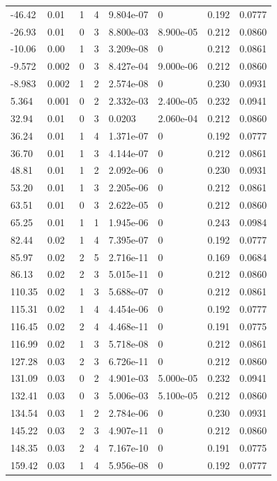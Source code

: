 \documentclass[preview]{standalone}
\begin{document}
{{\begin{tabular}{L{1.2cm}C{1.2cm} C{0.3cm}C{0.5cm} C{1.4cm}C{1.4cm} C{1.4cm}C{1.4cm}}
  -46.42  &  0.01  & 1     &  4 &  9.804e-07  & 0  & 0.192 &  0.0777   \\ 
  -26.93  &  0.01  & 0     &  3 &  8.800e-03  & 8.900e-05  & 0.212 &  0.0860   \\ 
  -10.06  &  0.00  & 1     &  3 &  3.209e-08  & 0  & 0.212 &  0.0861   \\ 
  -9.572  &  0.002  & 0     &  3 &  8.427e-04  & 9.000e-06  & 0.212 &  0.0860   \\ 
  -8.983  &  0.002  & 1     &  2 &  2.574e-08  & 0  & 0.230 &  0.0931   \\ 
  5.364  &  0.001  & 0     &  2 &  2.332e-03  & 2.400e-05  & 0.232 &  0.0941   \\ 
  32.94  &  0.01  & 0     &  3 &  0.0203  & 2.060e-04  & 0.212 &  0.0860   \\ 
  36.24  &  0.01  & 1     &  4 &  1.371e-07  & 0  & 0.192 &  0.0777   \\ 
  36.70  &  0.01  & 1     &  3 &  4.144e-07  & 0  & 0.212 &  0.0861   \\ 
  48.81  &  0.01  & 1     &  2 &  2.092e-06  & 0  & 0.230 &  0.0931   \\ 
  53.20  &  0.01  & 1     &  3 &  2.205e-06  & 0  & 0.212 &  0.0861   \\ 
  63.51  &  0.01  & 0     &  3 &  2.622e-05  & 0  & 0.212 &  0.0860   \\ 
  65.25  &  0.01  & 1     &  1 &  1.945e-06  & 0  & 0.243 &  0.0984   \\ 
  82.44  &  0.02  & 1     &  4 &  7.395e-07  & 0  & 0.192 &  0.0777   \\ 
  85.97  &  0.02  & 2     &  5 &  2.716e-11  & 0  & 0.169 &  0.0684   \\ 
  86.13  &  0.02  & 2     &  3 &  5.015e-11  & 0  & 0.212 &  0.0860   \\ 
  110.35  &  0.02  & 1     &  3 &  5.688e-07  & 0  & 0.212 &  0.0861   \\ 
  115.31  &  0.02  & 1     &  4 &  4.454e-06  & 0  & 0.192 &  0.0777   \\ 
  116.45  &  0.02  & 2     &  4 &  4.468e-11  & 0  & 0.191 &  0.0775   \\ 
  116.99  &  0.02  & 1     &  3 &  5.718e-08  & 0  & 0.212 &  0.0861   \\ 
  127.28  &  0.03  & 2     &  3 &  6.726e-11  & 0  & 0.212 &  0.0860   \\ 
  131.09  &  0.03  & 0     &  2 &  4.901e-03  & 5.000e-05  & 0.232 &  0.0941   \\ 
  132.41  &  0.03  & 0     &  3 &  5.006e-03  & 5.100e-05  & 0.212 &  0.0860   \\ 
  134.54  &  0.03  & 1     &  2 &  2.784e-06  & 0  & 0.230 &  0.0931   \\ 
  145.22  &  0.03  & 2     &  3 &  4.907e-11  & 0  & 0.212 &  0.0860   \\ 
  148.35  &  0.03  & 2     &  4 &  7.167e-10  & 0  & 0.191 &  0.0775   \\ 
  159.42  &  0.03  & 1     &  4 &  5.956e-08  & 0  & 0.192 &  0.0777   \\ 
\hline 
\end{tabular} 

}}
\end{document}

